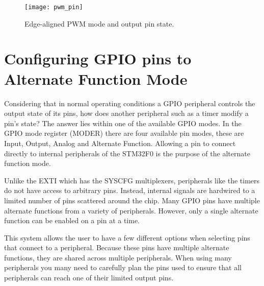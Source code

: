 \documentclass[11pt,fleqn]{book} %
\begin{document}
    
    
     \begin{figure}[]
        \centering\texttt{[image: pwm\_pin]}
        \caption{Edge-aligned PWM mode and output pin state.}
        \label{pwm_pin}
    \end{figure}

\section{Configuring GPIO pins to Alternate Function Mode}

Considering that in normal operating conditions a GPIO peripheral controls the output state of its pins, how does another peripheral such as a timer modify a pin's state? The answer lies within one of the available GPIO modes. In the GPIO mode register (MODER) there are four available pin modes, these are Input, Output, Analog and Alternate Function. Allowing a pin to connect directly to internal peripherals of the STM32F0 is the purpose of the alternate function mode. 

Unlike the EXTI which has the SYSCFG multiplexers, peripherals like the timers do not have access to arbitrary pins. Instead, internal signals are hardwired to a limited number of pins scattered around the chip. Many GPIO pins have multiple alternate functions from a variety of peripherals. However, only a single alternate function can be enabled on a pin at a time.

This system allows the user to have a few different options when selecting pins that connect to a peripheral. Because these pins have multiple alternate functions, they are shared across multiple peripherals. When using many peripherals you many need to carefully plan the pins used to ensure that all peripherals can reach one of their limited output pins.  

%    
    
\end{document}
